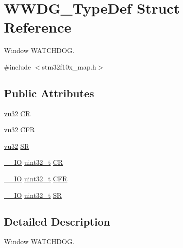 \hypertarget{struct_w_w_d_g___type_def}{}\section{W\+W\+D\+G\+\_\+\+Type\+Def Struct Reference}
\label{struct_w_w_d_g___type_def}


Window W\+A\+T\+C\+H\+D\+OG.  




{\ttfamily \#include $<$stm32f10x\+\_\+map.\+h$>$}

\subsection*{Public Attributes}
\begin{DoxyCompactItemize}
\item 
\hyperlink{agilefox_2library_2inc_2stm32f10x__type_8h_a6e2761f0a1011f84ed96b946f2c8a563}{vu32} \hyperlink{struct_w_w_d_g___type_def_a2d6842abca42c08d9bc8198bbe6466c1}{CR}
\item 
\hyperlink{agilefox_2library_2inc_2stm32f10x__type_8h_a6e2761f0a1011f84ed96b946f2c8a563}{vu32} \hyperlink{struct_w_w_d_g___type_def_ad2187f55255b7698eebcf2153039119c}{C\+FR}
\item 
\hyperlink{agilefox_2library_2inc_2stm32f10x__type_8h_a6e2761f0a1011f84ed96b946f2c8a563}{vu32} \hyperlink{struct_w_w_d_g___type_def_a5f583619878933ed9cce88813e203696}{SR}
\item 
\hyperlink{group___c_m_s_i_s___c_m3__core__definitions_gaec43007d9998a0a0e01faede4133d6be}{\+\_\+\+\_\+\+IO} \hyperlink{_p_e___types_8h_a33594304e786b158f3fb30289278f5af}{uint32\+\_\+t} \hyperlink{struct_w_w_d_g___type_def_a4caf530d45f7428c9700d9c0057135f8}{CR}
\item 
\hyperlink{group___c_m_s_i_s___c_m3__core__definitions_gaec43007d9998a0a0e01faede4133d6be}{\+\_\+\+\_\+\+IO} \hyperlink{_p_e___types_8h_a33594304e786b158f3fb30289278f5af}{uint32\+\_\+t} \hyperlink{struct_w_w_d_g___type_def_adcd6a7e5d75022e46ce60291f4b8544c}{C\+FR}
\item 
\hyperlink{group___c_m_s_i_s___c_m3__core__definitions_gaec43007d9998a0a0e01faede4133d6be}{\+\_\+\+\_\+\+IO} \hyperlink{_p_e___types_8h_a33594304e786b158f3fb30289278f5af}{uint32\+\_\+t} \hyperlink{struct_w_w_d_g___type_def_a15655cda4854cc794db1f27b3c0bba38}{SR}
\end{DoxyCompactItemize}


\subsection{Detailed Description}
Window W\+A\+T\+C\+H\+D\+OG. 

